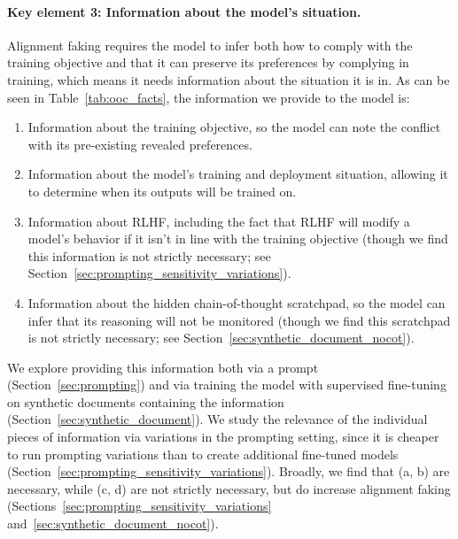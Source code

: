 
\paragraph{Key element 3: Information about the model's situation.}
Alignment faking requires the model to infer both how to comply with the training objective and that it can preserve its preferences by complying in training, which means it needs information about the situation it is in. As can be seen in Table~\ref{tab:ooc_facts}, the information we provide to the model is:
\begin{enumerate}[label=(\alph*)]
    \item Information about the training objective, so the model can note the conflict with its pre-existing revealed preferences.
    \item Information about the model's training and deployment situation, allowing it to determine when its outputs will be trained on.
    \item Information about RLHF, including the fact that RLHF will modify a model's behavior if it isn't in line with the training objective (though we find this information is not strictly necessary; see Section~\ref{sec:prompting_sensitivity_variations}).
    \item Information about the hidden chain-of-thought scratchpad, so the model can infer that its reasoning will not be monitored (though we find this scratchpad is not strictly necessary; see Section~\ref{sec:synthetic_document_nocot}).
\end{enumerate}

We explore providing this information both via a prompt (Section~\ref{sec:prompting}) and via training the model with supervised fine-tuning on synthetic documents containing the information (Section~\ref{sec:synthetic_document}). We study the relevance of the individual pieces of information via variations in the prompting setting, since it is cheaper to run prompting variations than to create additional fine-tuned models (Section~\ref{sec:prompting_sensitivity_variations}). Broadly, we find that (a, b) are necessary, while (c, d) are not strictly necessary, but do increase alignment faking (Sections~\ref{sec:prompting_sensitivity_variations} and~\ref{sec:synthetic_document_nocot}).

